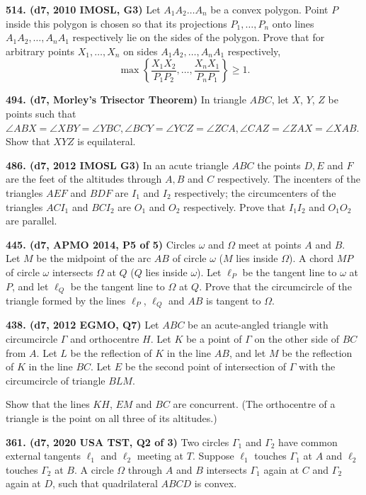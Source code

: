 \documentclass{article}
\begin{document}
\textbf{514. (\color{red}d7\color{black}, 2010 IMOSL, G3)} Let $A_1A_2 \ldots A_n$ be a convex polygon. Point $P$ inside this polygon is chosen so that its projections $P_1, \ldots , P_n$ onto lines $A_1A_2, \ldots , A_nA_1$ respectively lie on the sides of the polygon. Prove that for arbitrary points $X_1, \ldots , X_n$ on sides $A_1A_2, \ldots , A_nA_1$ respectively,
\[\max \left\{ \frac{X_1X_2}{P_1P_2}, \ldots, \frac{X_nX_1}{P_nP_1} \right\} \geq 1.\]

\textbf{494. (\color{red}d7\color{black}, Morley's Trisector Theorem)} In triangle $ABC$, let $X$, $Y$, $Z$ be points such that $\angle ABX = \angle XBY = \angle YBC, \angle BCY = \angle YCZ = \angle ZCA, \angle CAZ = \angle ZAX = \angle XAB$. Show that $XYZ$ is equilateral.

\textbf{486. (\color{red}d7\color{black}, 2012 IMOSL G3)} In an acute triangle $ABC$ the points $D,E$ and $F$ are the feet of the altitudes through $A,B$ and $C$ respectively. The incenters of the triangles $AEF$ and $BDF$ are $I_1$ and $I_2$ respectively; the circumcenters of the triangles $ACI_1$ and $BCI_2$ are $O_1$ and $O_2$ respectively. Prove that $I_1I_2$ and $O_1O_2$ are parallel.

\textbf{445. (\color{red}d7\color{black}, APMO 2014, P5 of 5)} Circles $\omega$ and $\Omega$ meet at points $A$ and $B$. Let $M$ be the midpoint of the arc $AB$ of circle $\omega$ ($M$ lies inside $\Omega$). A chord $MP$ of circle $\omega$ intersects $\Omega$ at $Q$ ($Q$ lies inside $\omega$). Let $\ell_P$ be the tangent line to $\omega$ at $P$, and let $\ell_Q$ be the tangent line to $\Omega$ at $Q$. Prove that the circumcircle of the triangle formed by the lines $\ell_P$, $\ell_Q$ and $AB$ is tangent to $\Omega$.

\textbf{438. (\color{red}d7\color{black}, 2012 EGMO, Q7)} Let $ABC$ be an acute-angled triangle with circumcircle $\Gamma$ and orthocentre $H$. Let $K$ be a point of $\Gamma$ on the other side of $BC$ from $A$. Let $L$ be the reflection of $K$ in the line $AB$, and let $M$ be the reflection of $K$ in the line $BC$. Let $E$ be the second point of intersection of $\Gamma $ with the circumcircle of triangle $BLM$.

Show that the lines $KH$, $EM$ and $BC$ are concurrent. (The orthocentre of a triangle is the point on all three of its altitudes.)

\textbf{361. (\color{red}d7\color{black}, 2020 USA TST, Q2 of 3)} Two circles $\Gamma_1$ and $\Gamma_2$ have common external tangents $\ell_1$ and $\ell_2$ meeting at $T$. Suppose $\ell_1$ touches $\Gamma_1$ at $A$ and $\ell_2$ touches $\Gamma_2$ at $B$. A circle $\Omega$ through $A$ and $B$ intersects $\Gamma_1$ again at $C$ and $\Gamma_2$ again at $D$, such that quadrilateral $ABCD$ is convex.
\end{document}
